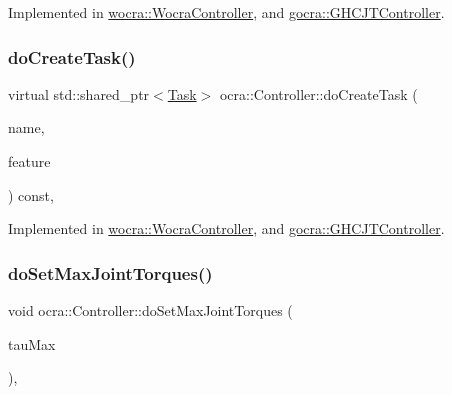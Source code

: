 Implemented in \hyperlink{classwocra_1_1WocraController_a4ce73b9a7b7026427e8abf44f54155af}{wocra\+::\+Wocra\+Controller}, and \hyperlink{classgocra_1_1GHCJTController_a989588cb4fa067230026394434c7a901}{gocra\+::\+G\+H\+C\+J\+T\+Controller}.

\hypertarget{classocra_1_1Controller_a358a31c0b6b6bdcc0e6da5c49eb9fde5}{}\label{classocra_1_1Controller_a358a31c0b6b6bdcc0e6da5c49eb9fde5} 
\subsubsection{\texorpdfstring{do\+Create\+Task()}{doCreateTask()}\hspace{0.1cm}{\footnotesize\ttfamily [2/2]}}
{\footnotesize\ttfamily virtual std\+::shared\+\_\+ptr$<$\hyperlink{classocra_1_1Task}{Task}$>$ ocra\+::\+Controller\+::do\+Create\+Task (\begin{DoxyParamCaption}\item[{const std\+::string \&}]{name,  }\item[{Feature\+::\+Ptr}]{feature }\end{DoxyParamCaption}) const\hspace{0.3cm}{\ttfamily [protected]}, {}}



Implemented in \hyperlink{classwocra_1_1WocraController_a1dec71e9c2fb5b2d6fab0bcd230e9c00}{wocra\+::\+Wocra\+Controller}, and \hyperlink{classgocra_1_1GHCJTController_af7c9e356c0991eff488e110fa4ecea5b}{gocra\+::\+G\+H\+C\+J\+T\+Controller}.

\hypertarget{classocra_1_1Controller_a75d6419229980f6088a689fcafc1d224}{}\label{classocra_1_1Controller_a75d6419229980f6088a689fcafc1d224} 
\subsubsection{\texorpdfstring{do\+Set\+Max\+Joint\+Torques()}{doSetMaxJointTorques()}}
{\footnotesize\ttfamily void ocra\+::\+Controller\+::do\+Set\+Max\+Joint\+Torques (\begin{DoxyParamCaption}\item[{const Eigen\+::\+Vector\+Xd \&}]{tau\+Max }\end{DoxyParamCaption})\hspace{0.3cm}{\ttfamily [protected]}, {\ttfamily [virtual]}}



